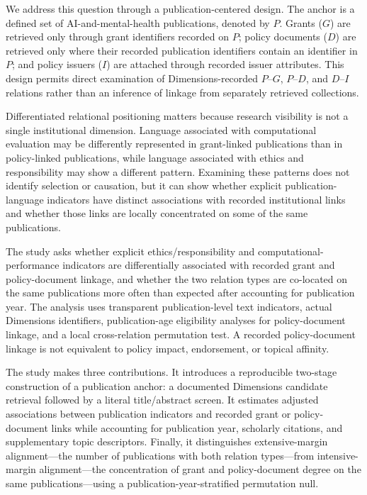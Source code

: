 \documentclass[12pt]{article}
\begin{document}
We address this question through a publication-centered design. The anchor is a defined set of AI-and-mental-health publications, denoted by $P$. Grants ($G$) are retrieved only through grant identifiers recorded on $P$; policy documents ($D$) are retrieved only where their recorded publication identifiers contain an identifier in $P$; and policy issuers ($I$) are attached through recorded issuer attributes. This design permits direct examination of Dimensions-recorded $P$--$G$, $P$--$D$, and $D$--$I$ relations rather than an inference of linkage from separately retrieved collections.

Differentiated relational positioning matters because research visibility is not a single institutional dimension. Language associated with computational evaluation may be differently represented in grant-linked publications than in policy-linked publications, while language associated with ethics and responsibility may show a different pattern. Examining these patterns does not identify selection or causation, but it can show whether explicit publication-language indicators have distinct associations with recorded institutional links and whether those links are locally concentrated on some of the same publications.

The study asks whether explicit ethics/responsibility and computational-performance indicators are differentially associated with recorded grant and policy-document linkage, and whether the two relation types are co-located on the same publications more often than expected after accounting for publication year. The analysis uses transparent publication-level text indicators, actual Dimensions identifiers, publication-age eligibility analyses for policy-document linkage, and a local cross-relation permutation test. A recorded policy-document linkage is not equivalent to policy impact, endorsement, or topical affinity.

The study makes three contributions. It introduces a reproducible two-stage construction of a publication anchor: a documented Dimensions candidate retrieval followed by a literal title/abstract screen. It estimates adjusted associations between publication indicators and recorded grant or policy-document links while accounting for publication year, scholarly citations, and supplementary topic descriptors. Finally, it distinguishes extensive-margin alignment---the number of publications with both relation types---from intensive-margin alignment---the concentration of grant and policy-document degree on the same publications---using a publication-year-stratified permutation null.
\end{document}
